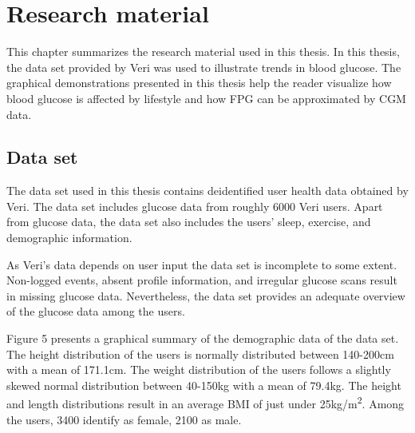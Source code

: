 \documentclass[english, 12pt, a4paper, elec, utf8, a-1b, online]{aaltothesis}
\begin{document}
\section{Research material}
This chapter summarizes the research material used in this thesis. In this thesis, the data set provided by Veri was used to illustrate trends in blood glucose.
The graphical demonstrations presented in this thesis help the reader visualize how blood glucose is affected by lifestyle and how FPG can be approximated by CGM data.

\subsection{Data set}
The data set used in this thesis contains deidentified user health data obtained by Veri. The data set includes 
glucose data from roughly 6000 Veri users. Apart from glucose data, the data set also includes the users' sleep,
exercise, and demographic information. 

As Veri's data depends on user input the data set is incomplete to some extent. Non-logged events, 
absent profile information, and irregular glucose scans result in missing glucose data. Nevertheless, 
the data set provides an adequate overview of the glucose data among the users.

Figure 5 presents a graphical summary of the demographic data of the data set. The height distribution of the users 
is normally distributed between 140-200cm with a mean of 171.1cm. The weight distribution of the users 
follows a slightly skewed normal distribution between 40-150kg with a mean of 79.4kg. The height and length
distributions result in an average BMI of just under 25kg/\si{\meter\squared}. Among the users, 
3400 identify as female, 2100 as male.
\end{document}
